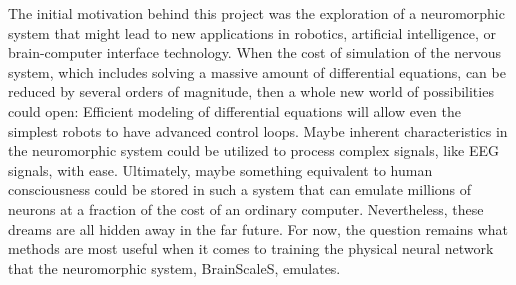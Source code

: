The initial motivation behind this project was the exploration of a neuromorphic system that might lead to new applications in robotics, artificial intelligence, or brain-computer interface technology.
When the cost of simulation of the nervous system, which includes solving a massive amount of differential equations, can be reduced by several orders of magnitude, then a whole new world of possibilities could open:
Efficient modeling of differential equations will allow even the simplest robots to have advanced control loops.
Maybe inherent characteristics in the neuromorphic system could be utilized to process complex signals, like EEG signals, with ease.
Ultimately, maybe something equivalent to human consciousness could be stored in such a system that can emulate millions of neurons at a fraction of the cost of an ordinary computer.
Nevertheless, these dreams are all hidden away in the far future.
For now, the question remains what methods are most useful when it comes to training the physical neural network that the neuromorphic system, BrainScaleS, emulates.
